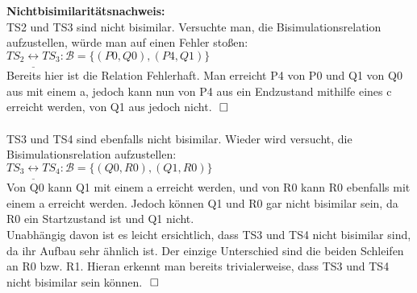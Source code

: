\documentclass[a4paper,11pt,fleqn]{scrartcl}
\begin{document}
\begin{enumerate}
	    \textbf{Nichtbisimilaritätsnachweis:} \\
	        TS2 und TS3 sind nicht bisimilar. Versuchte man, die Bisimulationsrelation aufzustellen, würde man
	        auf einen Fehler stoßen: \\
                $TS_2\underline{\leftrightarrow}TS_3: \mathcal{B} = \{(P0,Q0),(P4,Q1)\}$ \\
                Bereits hier ist die Relation Fehlerhaft. Man erreicht P4 von P0 und Q1 von Q0 aus mit einem a,
                jedoch kann nun von P4 aus ein Endzustand mithilfe eines c erreicht werden, von Q1 aus jedoch
                nicht. $\qed$ \\ \\
                TS3 und TS4 sind ebenfalls nicht bisimilar. Wieder wird versucht, die Bisimulationsrelation 
                aufzustellen: \\
                $TS_3\underline{\leftrightarrow}TS_4: \mathcal{B} = \{(Q0, R0),(Q1,R0)\}$ \\
                Von Q0 kann Q1 mit einem a erreicht werden, und von R0 kann R0 ebenfalls mit einem a erreicht
                werden. Jedoch können Q1 und R0 gar nicht bisimilar sein, da R0 ein Startzustand ist und Q1
                nicht. \\
                Unabhängig davon ist es leicht ersichtlich, dass TS3 und TS4 nicht bisimilar sind, da ihr
                Aufbau sehr ähnlich ist. Der einzige Unterschied sind die beiden Schleifen an R0 bzw. R1.
                Hieran erkennt man bereits trivialerweise, dass TS3 und TS4 nicht bisimilar sein können. $\qed$
    \end{enumerate}
\end{document}

